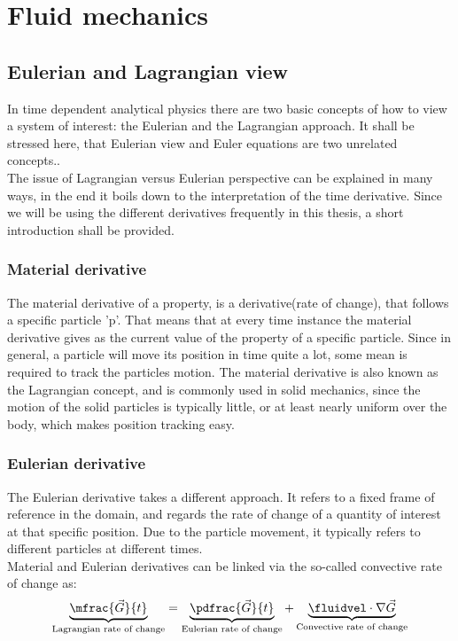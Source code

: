 \documentclass[../main.tex]{subfiles}
\begin{document}
\setlength{\delimitershortfall}{0pt}

\section{Fluid mechanics}\label{sec:fluid_mechanics}
\subsection{Eulerian and Lagrangian view}\label{sec:eulerian_lagrangian}
In time dependent analytical physics there are two basic concepts of how to view a system of interest: the Eulerian and the Lagrangian approach. It shall be stressed here, that Eulerian view and Euler equations are two unrelated concepts..\\
The issue of Lagrangian versus Eulerian perspective can be explained in many ways, in the end it boils down to the interpretation of the time derivative. Since we will be using the different derivatives frequently in this thesis, a short introduction shall be provided.
\subsubsection{Material derivative}
The material derivative of a property, is a derivative(rate of change), that follows a specific particle 'p'. That means that at every time instance the material derivative gives as the current value of the property of a specific particle. Since in general, a particle will move its position in time quite a lot, some mean is required to track the particles motion. The material derivative is also known as the Lagrangian concept, and is commonly used in solid mechanics, since the motion of the solid particles is typically little, or at least nearly uniform over the body, which makes position tracking easy.

\subsubsection{Eulerian derivative}
The Eulerian derivative takes a different approach. It refers to a fixed frame of reference in the domain, and regards the rate of change of a quantity of interest at that specific position. Due to the particle movement, it typically refers to different particles at different times.
\\
Material and Eulerian derivatives can be linked via the so-called convective rate of change as:
\begin{align}
\underbrace{\mfrac{\vec{G}}{t}}_{\text{Lagrangian rate of change}} = \underbrace{\pdfrac{\vec{G}}{t}}_{\text{Eulerian rate of change}} + \underbrace{\fluidvel\cdot\nabla\vec{G}}_{\text{Convective rate of change}}
\end{align}
\end{document}
